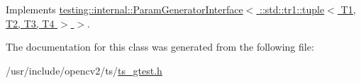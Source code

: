 Implements \hyperlink{classtesting_1_1internal_1_1ParamGeneratorInterface_ae82e6fc79efcef1c794ad333ffb5bf80}{testing\-::internal\-::\-Param\-Generator\-Interface$<$ \-::std\-::tr1\-::tuple$<$ T1, T2, T3, T4 $>$ $>$}.



The documentation for this class was generated from the following file\-:\begin{DoxyCompactItemize}
\item 
/usr/include/opencv2/ts/\hyperlink{ts__gtest_8h}{ts\-\_\-gtest.\-h}\end{DoxyCompactItemize}
